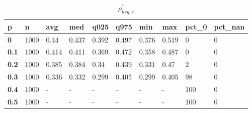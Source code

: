 \begin{table}[h]
 \centering 
\footnotesize
\caption{$\rho_{hsg,s}^\prime $}
\label{tab:alphahsgs}
\begin{tabular}[h]{|l|l|l|l|l|l|l|l|l|l|
    } \hline
\textbf{ p} & \textbf{ n} & \textbf{ avg} & \textbf{ med} & \textbf{ q025} & \textbf{ q975} & \textbf{ min} & \textbf{ max} & \textbf{ pct\_0} & \textbf{ pct\_nan}
    \\ \hline
  \textbf{  0} & 1000 &  0.44 & 0.437 & 0.392 & 0.497 & 0.376 & 0.519 &   0 & 0
    \\ \hline
  \textbf{0.1} & 1000 & 0.414 & 0.411 & 0.369 & 0.472 & 0.358 & 0.487 &   0 & 0
    \\ \hline
  \textbf{0.2} & 1000 & 0.385 & 0.384 &  0.34 & 0.439 & 0.331 &  0.47 &   2 & 0
    \\ \hline
  \textbf{0.3} & 1000 & 0.336 & 0.332 & 0.299 & 0.405 & 0.299 & 0.405 &  98 & 0
    \\ \hline
  \textbf{0.4} & 1000 & - & - & - & - & - & - & 100 & 0
    \\ \hline
  \textbf{0.5} & 1000 & - & - & - & - & - & - & 100 & 0
    \\ \hline
 \end{tabular}
 \end{table}

